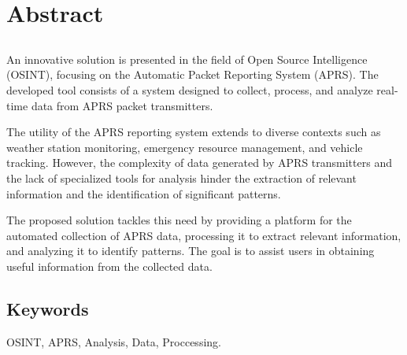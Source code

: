 \chapter*{Abstract}

\section*{\tituloPortadaEngVal}

An innovative solution is presented in the field of Open Source Intelligence (OSINT), focusing on the Automatic Packet Reporting System (APRS). The developed tool consists of a system designed to collect, process, and analyze real-time data from APRS packet transmitters.

The utility of the APRS reporting system extends to diverse contexts such as weather station monitoring, emergency resource management, and vehicle tracking. However, the complexity of data generated by APRS transmitters and the lack of specialized tools for analysis hinder the extraction of relevant information and the identification of significant patterns.

The proposed solution tackles this need by providing a platform for the automated collection of APRS data, processing it to extract relevant information, and analyzing it to identify patterns. The goal is to assist users in obtaining useful information from the collected data.


\section*{Keywords}

\noindent OSINT, APRS, Analysis, Data, Proccessing.



